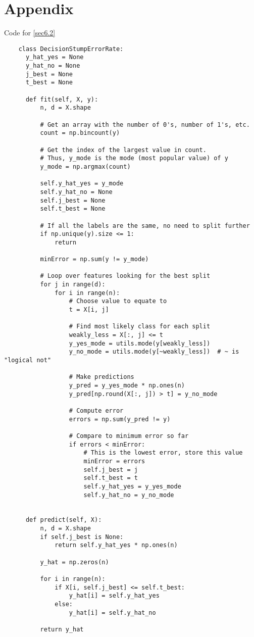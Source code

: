 \documentclass{article}
\begin{document}
  \clearpage \section{Appendix}
  Code for \ref{sec6.2}
  \label{code6.2}\begin{verbatim}
    class DecisionStumpErrorRate:
      y_hat_yes = None
      y_hat_no = None
      j_best = None
      t_best = None
  
      def fit(self, X, y):
          n, d = X.shape
  
          # Get an array with the number of 0's, number of 1's, etc.
          count = np.bincount(y)
  
          # Get the index of the largest value in count.
          # Thus, y_mode is the mode (most popular value) of y
          y_mode = np.argmax(count)
  
          self.y_hat_yes = y_mode
          self.y_hat_no = None
          self.j_best = None
          self.t_best = None
  
          # If all the labels are the same, no need to split further
          if np.unique(y).size <= 1:
              return
  
          minError = np.sum(y != y_mode)
  
          # Loop over features looking for the best split
          for j in range(d):
              for i in range(n):
                  # Choose value to equate to
                  t = X[i, j]
  
                  # Find most likely class for each split
                  weakly_less = X[:, j] <= t
                  y_yes_mode = utils.mode(y[weakly_less])
                  y_no_mode = utils.mode(y[~weakly_less])  # ~ is "logical not"
  
                  # Make predictions
                  y_pred = y_yes_mode * np.ones(n)
                  y_pred[np.round(X[:, j]) > t] = y_no_mode
  
                  # Compute error
                  errors = np.sum(y_pred != y)
  
                  # Compare to minimum error so far
                  if errors < minError:
                      # This is the lowest error, store this value
                      minError = errors
                      self.j_best = j
                      self.t_best = t
                      self.y_hat_yes = y_yes_mode
                      self.y_hat_no = y_no_mode
  
  
      def predict(self, X):
          n, d = X.shape
          if self.j_best is None:
              return self.y_hat_yes * np.ones(n)
  
          y_hat = np.zeros(n)
  
          for i in range(n):
              if X[i, self.j_best] <= self.t_best:
                  y_hat[i] = self.y_hat_yes
              else:
                  y_hat[i] = self.y_hat_no
  
          return y_hat
    \end{verbatim}
\end{document}
